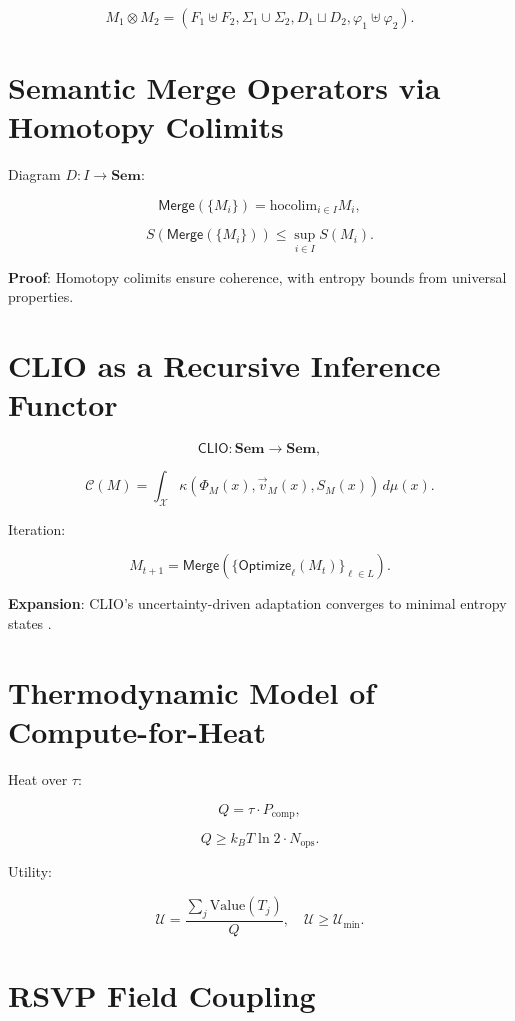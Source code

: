 \documentclass[12pt]{article}
\begin{document}
\[ M_1 \otimes M_2 = (F_1 \uplus F_2, \Sigma_1 \cup \Sigma_2, D_1 \sqcup D_2, \varphi_1 \uplus \varphi_2). \]

\section{Semantic Merge Operators via Homotopy Colimits}
\label{app:merge-operators}

Diagram $ D: I \to \mathbf{Sem} $:

\[ \mathsf{Merge}(\{M_i\}) = \mathrm{hocolim}_{i \in I} M_i, \]

\[ S(\mathsf{Merge}(\{M_i\})) \leq \sup_{i \in I} S(M_i). \]

\textbf{Proof}: Homotopy colimits ensure coherence, with entropy bounds from universal properties.

\section{CLIO as a Recursive Inference Functor}
\label{app:clio-functor}

\[ \mathsf{CLIO}: \mathbf{Sem} \to \mathbf{Sem}, \]

\[ \mathcal{C}(M) = \int_{\mathcal{X}} \kappa(\Phi_M(x), \vec{v}_M(x), S_M(x)) \, d\mu(x). \]

Iteration:

\[ M_{t+1} = \mathsf{Merge}(\{ \mathsf{Optimize}_\ell(M_t) \}_{\ell \in L}). \]

\textbf{Expansion}: CLIO’s uncertainty-driven adaptation converges to minimal entropy states \citep{ChengBroadbentChappell2025}.

\section{Thermodynamic Model of Compute-for-Heat}
\label{app:thermo-model}

Heat over $ \tau $:

\[ Q = \tau \cdot P_{\text{comp}}, \]

\[ Q \geq k_B T \ln 2 \cdot N_{\text{ops}}. \]

Utility:

\[ \mathcal{U} = \frac{\sum_{j} \mathrm{Value}(T_j)}{Q}, \quad \mathcal{U} \geq \mathcal{U}_{\text{min}}. \]

\section{RSVP Field Coupling}
\label{app:rsvp-coupling}
\end{document}
